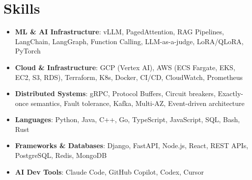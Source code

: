 \documentclass[letterpaper,11pt]{article}
\newcommand{\resumeSubHeadingListStart}{\begin{itemize}[leftmargin=0.15in, label={}]}
\newcommand{\resumeSubHeadingListEnd}{\end{itemize}}
\newcommand{\resumeSkillHeading}[2]{%
  \item\small{\textbf{#1}: #2 \vspace{-9pt}}%
}
\begin{document}
\section{Skills}
  \resumeSubHeadingListStart
    \resumeSkillHeading{ML \& AI Infrastructure}{vLLM, PagedAttention, RAG Pipelines, LangChain, LangGraph, Function Calling, LLM-as-a-judge, LoRA/QLoRA, PyTorch}
    \resumeSkillHeading{Cloud \& Infrastructure}{GCP (Vertex AI), AWS (ECS Fargate, EKS, EC2, S3, RDS), Terraform, K8s, Docker, CI/CD, CloudWatch, Prometheus}
    \resumeSkillHeading{Distributed Systems}{gRPC, Protocol Buffers, Circuit breakers, Exactly-once semantics, Fault tolerance, Kafka, Multi-AZ, Event-driven architecture}
    \resumeSkillHeading{Languages}{Python, Java, C++, Go, TypeScript, JavaScript, SQL, Bash, Rust}
    \resumeSkillHeading{Frameworks \& Databases}{Django, FastAPI, Node.js, React, REST APIs, PostgreSQL, Redis, MongoDB}
    \resumeSkillHeading{AI Dev Tools}{Claude Code, GitHub Copilot, Codex, Cursor}
  \resumeSubHeadingListEnd
\end{document}
